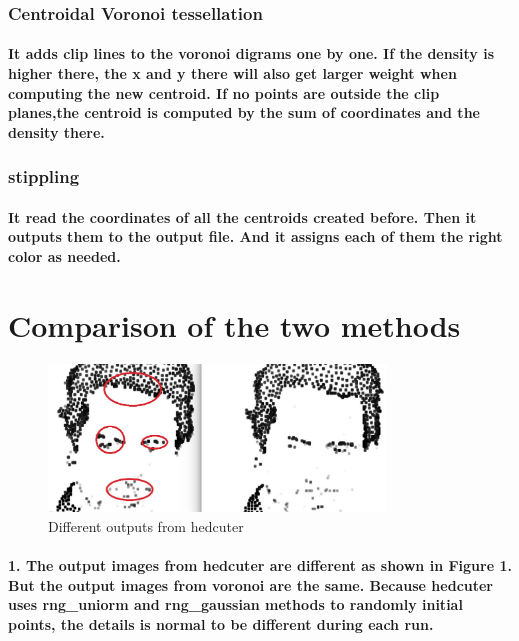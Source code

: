 \documentclass[11pt]{article}
\begin{document}
\subsubsection{Centroidal Voronoi tessellation}
\paragraph{It adds clip lines to the voronoi digrams one by one. If the density is higher there, the x and y there will also get larger weight when computing the new centroid. If no points are outside the clip planes,the centroid is computed by the sum of coordinates and the density there. }
\subsubsection{stippling}
\paragraph{It read the coordinates of all the centroids created before. Then it outputs them to the output file. And it assigns each of them the right color as needed.}
\section{Comparison of the two methods}
\begin{figure}[h!]
\centering
\includegraphics[width=0.80\textwidth]{figure1.eps}
\caption{Different outputs from hedcuter}
\label{threadsVsSync}
\end{figure}
\paragraph{1. The output images from hedcuter are different as shown in Figure 1. But the output images from voronoi are the same. Because hedcuter uses rng\_uniorm and rng\_gaussian methods to randomly initial points, the details is normal to be different during each run.}
\end{document}
